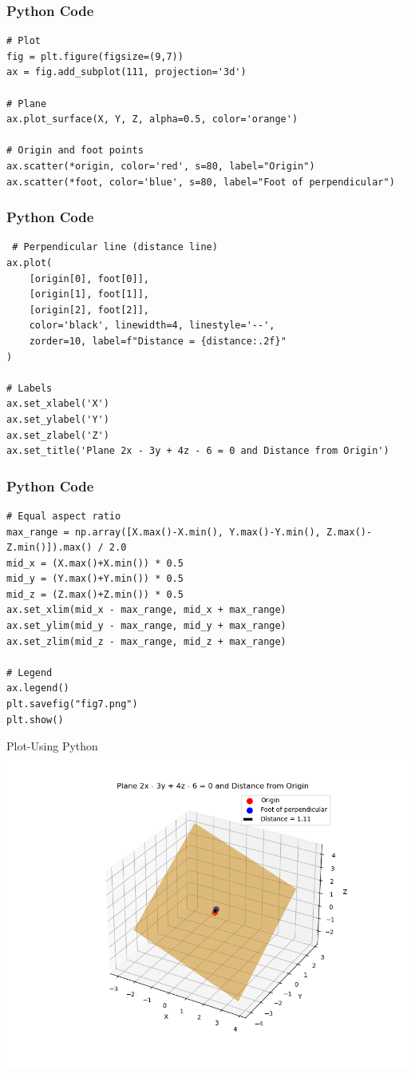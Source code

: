 \documentclass{beamer}
\begin{document}
\begin{frame}[fragile]
    \frametitle{Python Code}
    \begin{lstlisting}
# Plot
fig = plt.figure(figsize=(9,7))
ax = fig.add_subplot(111, projection='3d')

# Plane
ax.plot_surface(X, Y, Z, alpha=0.5, color='orange')

# Origin and foot points
ax.scatter(*origin, color='red', s=80, label="Origin")
ax.scatter(*foot, color='blue', s=80, label="Foot of perpendicular")
\end{lstlisting}
\end{frame}


\begin{frame}[fragile]
    \frametitle{Python Code}
    \begin{lstlisting}
 # Perpendicular line (distance line)
ax.plot(
    [origin[0], foot[0]],
    [origin[1], foot[1]],
    [origin[2], foot[2]],
    color='black', linewidth=4, linestyle='--',
    zorder=10, label=f"Distance = {distance:.2f}"
)       

# Labels
ax.set_xlabel('X')
ax.set_ylabel('Y')
ax.set_zlabel('Z')
ax.set_title('Plane 2x - 3y + 4z - 6 = 0 and Distance from Origin')
\end{lstlisting}
\end{frame}


\begin{frame}[fragile]
    \frametitle{Python Code}
    \begin{lstlisting}
# Equal aspect ratio
max_range = np.array([X.max()-X.min(), Y.max()-Y.min(), Z.max()-Z.min()]).max() / 2.0
mid_x = (X.max()+X.min()) * 0.5
mid_y = (Y.max()+Y.min()) * 0.5
mid_z = (Z.max()+Z.min()) * 0.5
ax.set_xlim(mid_x - max_range, mid_x + max_range)
ax.set_ylim(mid_y - max_range, mid_y + max_range)
ax.set_zlim(mid_z - max_range, mid_z + max_range)

# Legend
ax.legend()
plt.savefig("fig7.png") 
plt.show()
\end{lstlisting}
\end{frame}


\begin{frame}{Plot-Using Python}
    \centering
    \includegraphics[width=\columnwidth, height=0.8\textheight, keepaspectratio]{Figs/fig7.png}     
\end{frame}
\end{document}
